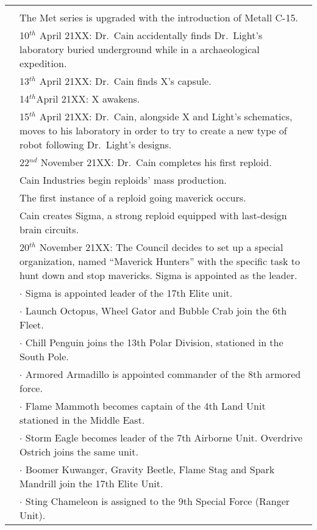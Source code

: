 \begin{tabularx}{\linewidth}{l X}
	\midrule
	\rowcolor{Aquamarine}
	\multicolumn{2}{c}{\textbf{21XX}}\\
	\addlinespace[1.5ex]
	\tabdot& The Met series is upgraded with the introduction of Metall C-15.\\
	\tabdot&10$^{th}$ April 21XX: Dr.~Cain accidentally finds Dr.~Light's laboratory buried underground while in a archaeological expedition.\\
	\tabdot&13$^{th}$ April 21XX: Dr.~Cain finds X's capsule.\\ 
	\tabdot& 14$^{th} $April 21XX: X awakens.\\
	\tabdot& 15$^{th}$ April 21XX: Dr.~Cain, alongside X and Light's schematics, moves to his laboratory in order to try to create a new type of robot following Dr.~Light's designs.\\
	\tabdot& 22$^{nd}$ November 21XX: Dr.~Cain completes his first reploid.\\
	\tabdot& Cain Industries begin reploids' mass production.\\
	\tabdot& The first instance of a reploid going maverick occurs.\\
	\tabdot& Cain creates Sigma, a strong reploid equipped with last-design brain circuits.\\
	\tabdot& 20$^{th}$ November 21XX: The Council decides to set up a special organization, named ``Maverick Hunters'' with the specific task to hunt down and stop mavericks. Sigma is appointed as the leader.\\
	\tabline& $\cdot$ Sigma is appointed leader of the 17th Elite unit.\\
	\tabline& $\cdot$ Launch Octopus, Wheel Gator and Bubble Crab join the 6th Fleet.\\
	\tabline& $\cdot$ Chill Penguin joins the 13th Polar Division, stationed in the South Pole.\\
	\tabline& $\cdot$ Armored Armadillo is appointed commander of the 8th armored force.\\
	\tabline& $\cdot$ Flame Mammoth becomes captain of the 4th Land Unit stationed in the Middle East.\\
	\tabline& $\cdot$ Storm Eagle becomes leader of the 7th Airborne Unit. Overdrive Ostrich joins the same unit.\\
	\tabline& $\cdot$ Boomer Kuwanger, Gravity Beetle, Flame Stag and Spark Mandrill join the 17th Elite Unit.\\
	\tabline& $\cdot$ Sting Chameleon is assigned to the 9th Special Force (Ranger Unit).\\

\end{tabularx}

